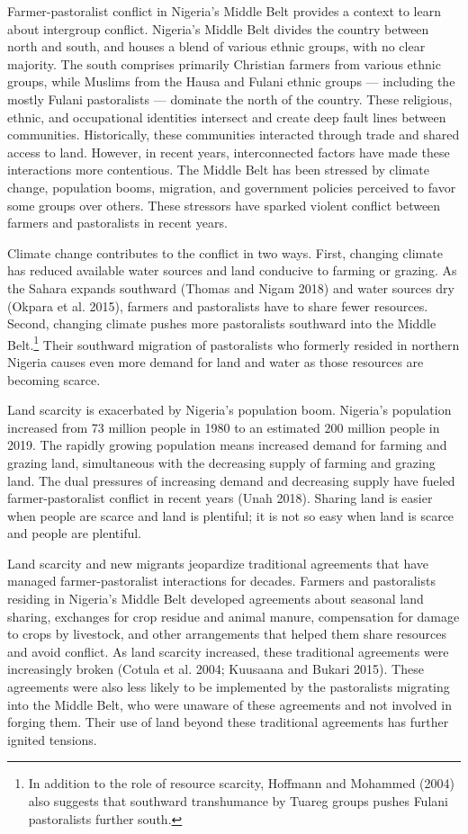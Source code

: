\documentclass[11pt]{article}
\begin{document}
Farmer-pastoralist conflict in Nigeria's Middle Belt provides a context
to learn about intergroup conflict. Nigeria's Middle Belt divides the
country between north and south, and houses a blend of various ethnic
groups, with no clear majority. The south comprises primarily Christian
farmers from various ethnic groups, while Muslims from the Hausa and
Fulani ethnic groups --- including the mostly Fulani pastoralists ---
dominate the north of the country. These religious, ethnic, and
occupational identities intersect and create deep fault lines between
communities. Historically, these communities interacted through trade
and shared access to land. However, in recent years, interconnected
factors have made these interactions more contentious. The Middle Belt
has been stressed by climate change, population booms, migration, and
government policies perceived to favor some groups over others. These
stressors have sparked violent conflict between farmers and pastoralists
in recent years.

Climate change contributes to the conflict in two ways. First, changing
climate has reduced available water sources and land conducive to
farming or grazing. As the Sahara expands southward (Thomas and Nigam
2018) and water sources dry (Okpara et al. 2015), farmers and
pastoralists have to share fewer resources. Second, changing climate
pushes more pastoralists southward into the Middle Belt.\footnote{In
  addition to the role of resource scarcity, Hoffmann and Mohammed
  (2004) also suggests that southward transhumance by Tuareg groups
  pushes Fulani pastoralists further south.} Their southward migration
of pastoralists who formerly resided in northern Nigeria causes even
more demand for land and water as those resources are becoming scarce.

Land scarcity is exacerbated by Nigeria's population boom. Nigeria's
population increased from 73 million people in 1980 to an estimated 200
million people in 2019. The rapidly growing population means increased
demand for farming and grazing land, simultaneous with the decreasing
supply of farming and grazing land. The dual pressures of increasing
demand and decreasing supply have fueled farmer-pastoralist conflict in
recent years (Unah 2018). Sharing land is easier when people are scarce
and land is plentiful; it is not so easy when land is scarce and people
are plentiful.

Land scarcity and new migrants jeopardize traditional agreements that
have managed farmer-pastoralist interactions for decades. Farmers and
pastoralists residing in Nigeria's Middle Belt developed agreements
about seasonal land sharing, exchanges for crop residue and animal
manure, compensation for damage to crops by livestock, and other
arrangements that helped them share resources and avoid conflict. As
land scarcity increased, these traditional agreements were increasingly
broken (Cotula et al. 2004; Kuusaana and Bukari 2015). These agreements
were also less likely to be implemented by the pastoralists migrating
into the Middle Belt, who were unaware of these agreements and not
involved in forging them. Their use of land beyond these traditional
agreements has further ignited tensions.
\end{document}

